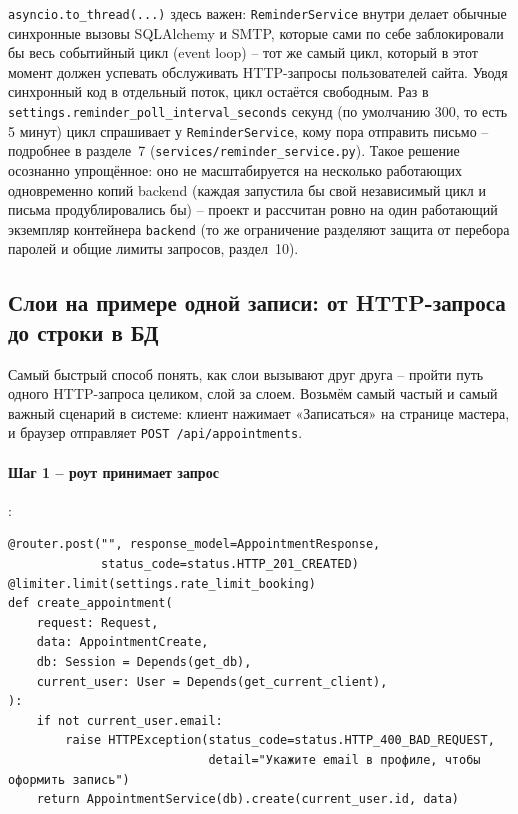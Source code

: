 \texttt{asyncio.to_thread(...)} здесь важен: \texttt{ReminderService}
внутри делает обычные синхронные вызовы SQLAlchemy и SMTP, которые сами
по себе заблокировали бы весь событийный цикл (event loop) -- тот же
самый цикл, который в этот момент должен успевать обслуживать HTTP-запросы
пользователей сайта. Уводя синхронный код в отдельный поток, цикл
остаётся свободным. Раз в \texttt{settings.reminder_poll_interval_seconds}
секунд (по умолчанию 300, то есть 5 минут) цикл спрашивает у
\texttt{ReminderService}, кому пора отправить письмо -- подробнее в
разделе~7 (\texttt{services/reminder_service.py}). Такое решение
осознанно упрощённое: оно не масштабируется на несколько работающих
одновременно копий backend (каждая запустила бы свой независимый цикл и
письма продублировались бы) -- проект и рассчитан ровно на один
работающий экземпляр контейнера \texttt{backend} (то же ограничение
разделяют защита от перебора паролей и общие лимиты запросов, раздел~10).

\subsection{Слои на примере одной записи: от HTTP-запроса до строки в БД}

Самый быстрый способ понять, как слои вызывают друг друга -- пройти путь
одного HTTP-запроса целиком, слой за слоем. Возьмём самый частый и самый
важный сценарий в системе: клиент нажимает «Записаться» на странице
мастера, и браузер отправляет
\texttt{POST /api/appointments}.

\paragraph{Шаг 1 -- роут принимает запрос}
:

\begin{verbatim}
@router.post("", response_model=AppointmentResponse,
             status_code=status.HTTP_201_CREATED)
@limiter.limit(settings.rate_limit_booking)
def create_appointment(
    request: Request,
    data: AppointmentCreate,
    db: Session = Depends(get_db),
    current_user: User = Depends(get_current_client),
):
    if not current_user.email:
        raise HTTPException(status_code=status.HTTP_400_BAD_REQUEST,
                            detail="Укажите email в профиле, чтобы оформить запись")
    return AppointmentService(db).create(current_user.id, data)
\end{verbatim}

